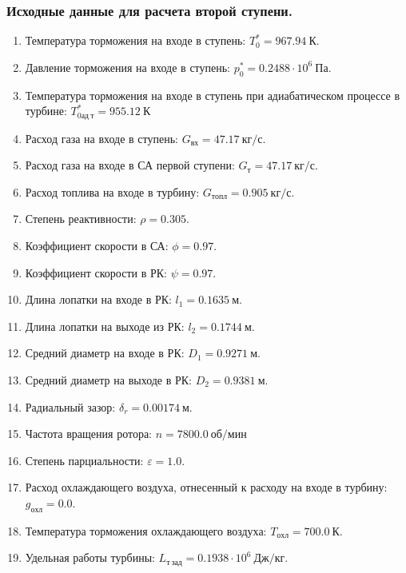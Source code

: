 \documentclass[a4paper,12pt]{article}
\begin{document}
    \subsubsection{Исходные данные для расчета второй ступени.}
%    
    \begin{enumerate}

        \item Температура торможения на входе в ступень: $T_0^* = 967.94\ К $.
        \item Давление торможения на входе в ступень: $p_0^* = 0.2488 \cdot 10^6 \ Па$.
        \item Температура торможения на входе в ступень при адиабатическом процессе в турбине: $T_{0ад\ т}^* = 955.12\ К$
        \item Расход газа на входе в ступень: $G_{вх} = 47.17\ кг/с$.
        \item Расход газа на входе в СА первой ступени: $ G_т = 47.17\ кг/с $.
        \item Расход топлива на входе в турбину: $ G_{топл} = 0.905\ кг/с $.
        \item Степень реактивности: $ \rho = 0.305 $.
        \item Коэффициент скорости в СА: $ \phi = 0.97 $.
        \item Коэффициент скорости в РК: $ \psi = 0.97 $.
        \item Длина лопатки на входе в РК: $ l_1 = 0.1635\ м $.
        \item Длина лопатки на выходе из РК: $ l_2 = 0.1744\ м $.
        \item Средний диаметр на входе в РК: $ D_1 = 0.9271\ м $.
        \item Средний диаметр на выходе в РК: $ D_2 = 0.9381\ м $.
        \item Радиальный зазор: $ \delta_r = 0.00174\ м $.
        \item Частота вращения ротора: $ n = 7800.0\ об/мин $
        \item Степень парциальности: $ \varepsilon = 1.0 $.
        \item Расход охлаждающего воздуха, отнесенный к расходу на входе в турбину: $ g_{охл} = 0.0 $.
        \item Температура торможения охлаждающего воздуха: $ T_{охл} = 700.0\ К $.

        
        \item Удельная работы турбины: $ L_{т\ зад} = 0.1938 \cdot 10^6 \ Дж/кг $.

        

    \end{enumerate}
    
\end{document}
